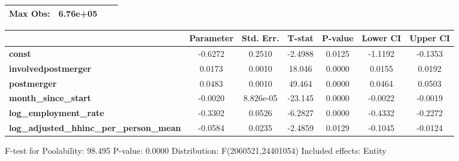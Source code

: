 \documentclass{report}
\begin{document}
\begin{center}
\begin{tabular}{lclc}
\textbf{Max Obs:}                                &       6.76e+05       & \textbf{                     }   &                  \\
\bottomrule
\end{tabular}
\begin{tabular}{lcccccc}
                                                 & \textbf{Parameter} & \textbf{Std. Err.} & \textbf{T-stat} & \textbf{P-value} & \textbf{Lower CI} & \textbf{Upper CI}  \\
\midrule
\textbf{const}                                   &      -0.6272       &       0.2510       &     -2.4988     &      0.0125      &      -1.1192      &      -0.1353       \\
\textbf{involvedpostmerger}                      &       0.0173       &       0.0010       &      18.046     &      0.0000      &       0.0155      &       0.0192       \\
\textbf{postmerger}                              &       0.0483       &       0.0010       &      49.464     &      0.0000      &       0.0464      &       0.0503       \\
\textbf{month\_since\_start}                     &      -0.0020       &     8.826e-05      &     -23.145     &      0.0000      &      -0.0022      &      -0.0019       \\
\textbf{log\_employment\_rate}                   &      -0.3302       &       0.0526       &     -6.2827     &      0.0000      &      -0.4332      &      -0.2272       \\
\textbf{log\_adjusted\_hhinc\_per\_person\_mean} &      -0.0584       &       0.0235       &     -2.4859     &      0.0129      &      -0.1045      &      -0.0124       \\
\bottomrule
\end{tabular}
\end{center}

F-test for Poolability: 98.495 \newline
 P-value: 0.0000 \newline
 Distribution: F(2060521,24401054) \newline
  \newline
 Included effects: Entity
\end{document}
